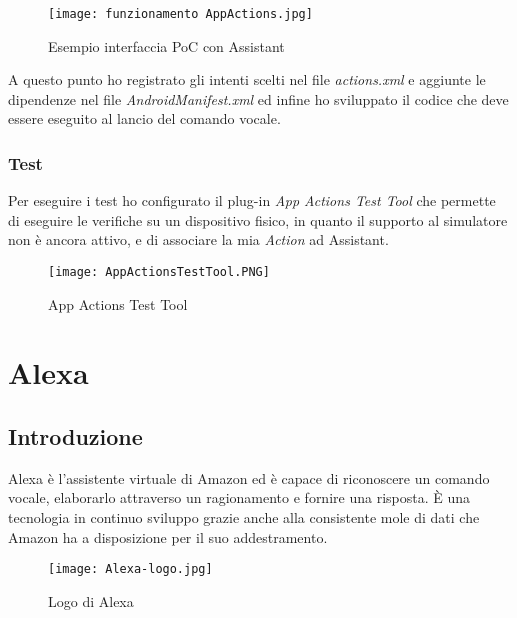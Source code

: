 		\pagebreak
		
		\begin{figure}[htbp]
			\begin{center}
				\texttt{[image: funzionamento AppActions.jpg]}
				\caption{Esempio interfaccia PoC con Assistant}
			\end{center}
		\end{figure}
	
		A questo punto ho registrato gli intenti scelti nel file \emph{actions.xml} e aggiunte le dipendenze nel file \emph{AndroidManifest.xml} ed infine ho sviluppato il codice che deve essere eseguito al lancio del comando vocale.

		\subsubsection{Test}
		Per eseguire i test ho configurato il plug-in \emph{App Actions Test Tool} che permette di eseguire le verifiche su un dispositivo fisico, in quanto il supporto al simulatore non è ancora attivo, e di associare la mia \emph{Action} ad Assistant.
		
		\begin{figure}[htbp]
			\begin{center}
				\texttt{[image: AppActionsTestTool.PNG]}
				\caption{App Actions Test Tool}
			\end{center}
		\end{figure}
	\pagebreak
		
\section{Alexa}
	\subsection{Introduzione}
	Alexa è l'assistente virtuale di Amazon ed è capace di riconoscere un comando vocale, elaborarlo attraverso un ragionamento e fornire una risposta. È una tecnologia in continuo sviluppo grazie anche alla consistente mole di dati che Amazon ha a disposizione per il suo addestramento.
	
	\begin{figure}[htbp]
		\begin{center}
			\texttt{[image: Alexa-logo.jpg]}
			\caption{Logo di Alexa}
		\end{center}
	\end{figure}
	

